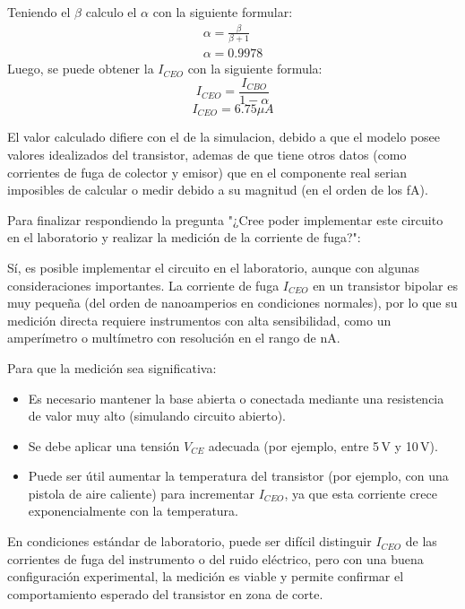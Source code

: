     Teniendo el $\beta$ calculo el $\alpha$ con la siguiente formular:
    \begin{gather*}
      \alpha=\frac{\beta}{\beta+1}\\
      \alpha=0.9978
    \end{gather*}
    Luego, se puede obtener la $I_{CEO}$ con la siguiente formula:
    \begin{equation}
      I_{CEO}=\frac{I_{CBO}}{1-\alpha}
    \end{equation}
    \begin{equation*}
      I_{CEO}= 6.75 \mu A
    \end{equation*}

    El valor calculado difiere con el de la simulacion, debido a que el modelo posee valores idealizados del transistor,
    ademas de que tiene otros datos (como corrientes de fuga de colector y emisor) que en el componente real serian
    imposibles de calcular o medir debido a su magnitud (en el orden de los fA).

    Para finalizar respondiendo la pregunta "¿Cree poder implementar este circuito en el laboratorio y realizar la
    medición de la corriente de fuga?":

    Sí, es posible implementar el circuito en el laboratorio, aunque con algunas consideraciones importantes. La
    corriente de fuga $I_{CEO}$ en un transistor bipolar es muy pequeña (del orden de nanoamperios en condiciones
    normales), por lo que su medición directa requiere instrumentos con alta sensibilidad, como un amperímetro o
    multímetro con resolución en el rango de nA.

    Para que la medición sea significativa:

    \begin{itemize}
      \item Es necesario mantener la base abierta o conectada mediante una resistencia de valor muy alto (simulando
          circuito abierto).
      \item Se debe aplicar una tensión $V_{CE}$ adecuada (por ejemplo, entre 5\,V y 10\,V).
      \item Puede ser útil aumentar la temperatura del transistor (por ejemplo, con una pistola de aire caliente) para
          incrementar $I_{CEO}$, ya que esta corriente crece exponencialmente con la temperatura.
    \end{itemize}

    En condiciones estándar de laboratorio, puede ser difícil distinguir $I_{CEO}$ de las corrientes de fuga del
    instrumento o del ruido eléctrico, pero con una buena configuración experimental, la medición es viable y permite
    confirmar el comportamiento esperado del transistor en zona de corte.
